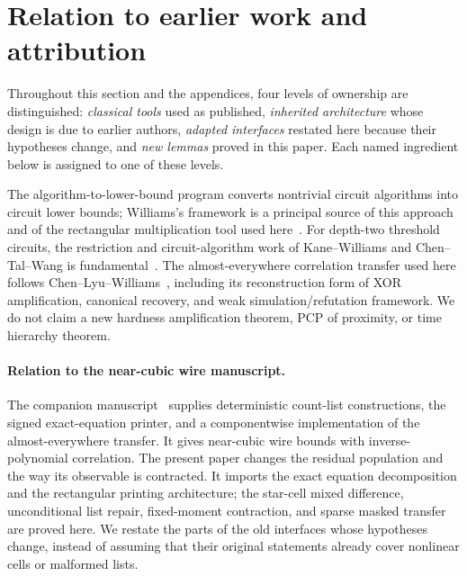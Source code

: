 \documentclass[11pt,letterpaper]{article}
\theoremstyle{definition}
\theoremstyle{remark}
\begin{document}
\section{Relation to earlier work and attribution}
\label{sec:related}

Throughout this section and the appendices, four levels of ownership
are distinguished: \emph{classical tools} used as published,
\emph{inherited architecture} whose design is due to earlier authors,
\emph{adapted interfaces} restated here because their hypotheses
change, and \emph{new lemmas} proved in this paper. Each named
ingredient below is assigned to one of these levels.

The algorithm-to-lower-bound program converts nontrivial circuit
algorithms into circuit lower bounds; Williams's framework is a principal
source of this approach and of the rectangular multiplication tool used
here~\cite{WilliamsRect}. For depth-two threshold circuits, the
restriction and circuit-algorithm work of Kane--Williams and
Chen--Tal--Wang is fundamental~\cite{KaneWilliams,CTW}. The
almost-everywhere correlation transfer used here follows
Chen--Lyu--Williams~\cite{CLW}, including its reconstruction form of XOR
amplification, canonical recovery, and weak simulation/refutation
framework. We do not claim a new hardness amplification theorem, PCP of
proximity, or time hierarchy theorem.

\paragraph{Relation to the near-cubic wire manuscript.}
The companion manuscript~\cite{NagCubic} supplies deterministic
count-list constructions, the signed exact-equation printer, and a
componentwise implementation of the almost-everywhere transfer. It gives
near-cubic wire bounds with inverse-polynomial correlation. The present
paper changes the residual population and the way its observable is
contracted. It imports the exact equation decomposition and the
rectangular printing architecture; the star-cell mixed difference,
unconditional list repair, fixed-moment contraction, and sparse masked
transfer are proved here. We restate the parts of the old interfaces
whose hypotheses change, instead of assuming that their original
statements already cover nonlinear cells or malformed lists.
\end{document}
